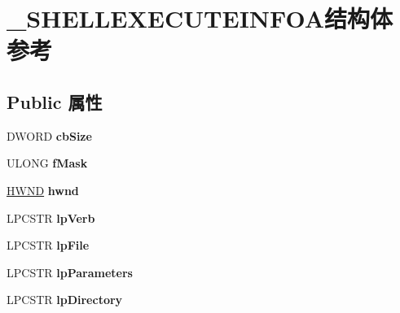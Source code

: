 \hypertarget{struct___s_h_e_l_l_e_x_e_c_u_t_e_i_n_f_o_a}{}\section{\+\_\+\+S\+H\+E\+L\+L\+E\+X\+E\+C\+U\+T\+E\+I\+N\+F\+O\+A结构体 参考}
\label{struct___s_h_e_l_l_e_x_e_c_u_t_e_i_n_f_o_a}
\subsection*{Public 属性}
\begin{DoxyCompactItemize}
\item 
\mbox{\label{struct___s_h_e_l_l_e_x_e_c_u_t_e_i_n_f_o_a_a118ec49fea65f7105e0dfd53ff1a6676}} 
D\+W\+O\+RD {\bfseries cb\+Size}
\item 
\mbox{\label{struct___s_h_e_l_l_e_x_e_c_u_t_e_i_n_f_o_a_a6e69d559ab4571b623ad020fa44e40f7}} 
U\+L\+O\+NG {\bfseries f\+Mask}
\item 
\mbox{\label{struct___s_h_e_l_l_e_x_e_c_u_t_e_i_n_f_o_a_acd356b25c750b0a899af7050b9164936}} 
\hyperlink{interfacevoid}{H\+W\+ND} {\bfseries hwnd}
\item 
\mbox{\label{struct___s_h_e_l_l_e_x_e_c_u_t_e_i_n_f_o_a_a6f17df91b827c91b0eaaaa42f7c9b53a}} 
L\+P\+C\+S\+TR {\bfseries lp\+Verb}
\item 
\mbox{\label{struct___s_h_e_l_l_e_x_e_c_u_t_e_i_n_f_o_a_aa4f4d4091036b38e1fb756275fabce97}} 
L\+P\+C\+S\+TR {\bfseries lp\+File}
\item 
\mbox{\label{struct___s_h_e_l_l_e_x_e_c_u_t_e_i_n_f_o_a_a15af4633f48e66fd06aa5b44cf05a06d}} 
L\+P\+C\+S\+TR {\bfseries lp\+Parameters}
\item 
\mbox{\label{struct___s_h_e_l_l_e_x_e_c_u_t_e_i_n_f_o_a_aff1909086dfbbc35f8422133fdb2e646}} 
L\+P\+C\+S\+TR {\bfseries lp\+Directory}

\end{DoxyCompactItemize}
